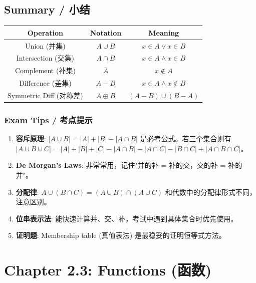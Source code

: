 \documentclass[10pt,a4paper,openany]{ctexbook}
\theoremstyle{definition}
\theoremstyle{remark}
\begin{document}
\vspace{-2pt}

\subsection{Summary / 小结}

\begin{center}
\begin{tabular}{ccc}
\hline
Operation & Notation & Meaning \\ \hline
Union (并集) & $A \cup B$ & $x \in A \lor x \in B$ \\
Intersection (交集) & $A \cap B$ & $x \in A \land x \in B$ \\
Complement (补集) & $\overline{A}$ & $x \notin A$ \\
Difference (差集) & $A - B$ & $x \in A \land x \notin B$ \\
Symmetric Diff (对称差) & $A \oplus B$ & $(A-B)\cup(B-A)$ \\
\hline
\end{tabular}

\end{center}

\subsubsection{Exam Tips / 考点提示}

\begin{enumerate}
\item \textbf{容斥原理}: $|A \cup B| = |A| + |B| - |A \cap B|$ 是必考公式。若三个集合则有 $|A \cup B \cup C| = |A|+|B|+|C| - |A\cap B| - |A\cap C| - |B\cap C| + |A\cap B\cap C|$。
\item \textbf{De Morgan's Laws}: 非常常用，记住"并的补 = 补的交，交的补 = 补的并"。
\item \textbf{分配律}: $A \cup (B \cap C) = (A \cup B) \cap (A \cup C)$ 和代数中的分配律形式不同，注意区别。
\item \textbf{位串表示法}: 能快速计算并、交、补，考试中遇到具体集合时优先使用。
\item \textbf{证明题}: Membership table (真值表法) 是最稳妥的证明恒等式方法。

\end{enumerate}


\section{Chapter 2.3: Functions (函数)}
\end{document}
